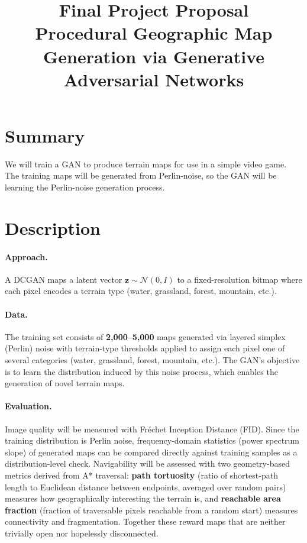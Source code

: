 \documentclass{article}
\title{\vspace{-1.5em}Final Project Proposal\\[0.3em]\large Procedural Geographic Map Generation via Generative Adversarial Networks\vspace{-1em}}
\author{}
\date{}
\begin{document}
\maketitle

\section*{Summary}
We will train a GAN to produce terrain maps for use in a simple video game. 
The training maps will be generated from Perlin-noise, so the GAN will be learning
the Perlin-noise generation process.

\section*{Description}

\paragraph{Approach.}
A DCGAN maps a latent vector $\mathbf{z} \sim \mathcal{N}(0,I)$ to a fixed-resolution bitmap
where each pixel encodes a terrain type (water, grassland, forest, mountain, etc.).

\paragraph{Data.}
The training set consists of \textbf{2,000--5,000} maps generated via layered simplex (Perlin) noise
with terrain-type thresholds applied to assign each pixel one of several categories
(water, grassland, forest, mountain, etc.). The GAN's objective is to learn the distribution
induced by this noise process, which enables the generation of novel terrain maps.

\paragraph{Evaluation.}
Image quality will be measured with Fr\'echet Inception Distance (FID).
Since the training distribution is Perlin noise, frequency-domain statistics (power spectrum slope)
of generated maps can be compared directly against training samples as a distribution-level check.
Navigability will be assessed with two geometry-based metrics derived from A* traversal:
\textbf{path tortuosity} (ratio of shortest-path length to Euclidean distance between endpoints,
averaged over random pairs) measures how geographically interesting the terrain is, and
\textbf{reachable area fraction} (fraction of traversable pixels reachable from a random start)
measures connectivity and fragmentation.
Together these reward maps that are neither trivially open nor hopelessly disconnected.
\end{document}
